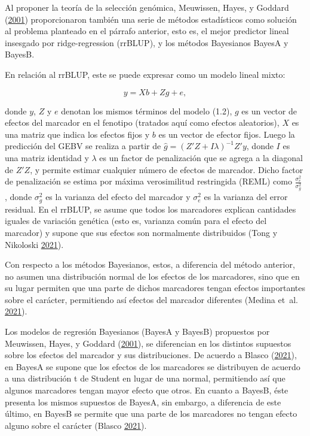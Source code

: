 \documentclass[11pt,spanish,a4paper,oneside,]{book} %
\begin{document}
Al proponer la teoría de la selección genómica, Meuwissen, Hayes, y Goddard (\protect\hyperlink{ref-cite:8}{2001}) proporcionaron también una serie de métodos estadísticos como solución al problema planteado en el párrafo anterior, esto es, el mejor predictor lineal insesgado por ridge-regression (rrBLUP), y los métodos Bayesianos BayesA y BayesB.

En relación al rrBLUP, este se puede expresar como un modelo lineal mixto:

\begin{equation}
y = Xb + Zg + e,
\end{equation}

donde \(y\), \(Z\) y \(e\) denotan los mismos términos del modelo (1.2), \(g\) es un vector de efectos del marcador en el fenotipo (tratados aquí como efectos aleatorios), \(X\) es una matriz que indica los efectos fijos y \(b\) es un vector de efector fijos. Luego la predicción del GEBV se realiza a partir de \(\hat{g} = (Z'Z + I \lambda)^{- 1} Z'y\), donde \(I\) es una matriz identidad y \(\lambda\) es un factor de penalización que se agrega a la diagonal de \(Z'Z\), y permite estimar cualquier número de efectos de marcador. Dicho factor de penalización se estima por máxima verosimilitud restringida (REML) como \(\frac{\sigma^{2}_{e}} {\sigma^{2}_{g}}\) , donde \(\sigma^{2}_{g}\) es la varianza del efecto del marcador y \(\sigma^{2}_{e}\) es la varianza del error residual. En el rrBLUP, se asume que todos los marcadores explican cantidades iguales de variación genética (esto es, varianza común para el efecto del marcador) y supone que sus efectos son normalmente distribuidos (Tong y Nikoloski \protect\hyperlink{ref-cite:7}{2021}).

Con respecto a los métodos Bayesianos, estos, a diferencia del método anterior, no asumen una distribución normal de los efectos de los marcadores, sino que en su lugar permiten que una parte de dichos marcadores tengan efectos importantes sobre el carácter, permitiendo así efectos del marcador diferentes (Medina et~al. \protect\hyperlink{ref-cite:38}{2021}).

Los modelos de regresión Bayesianos (BayesA y BayesB) propuestos por Meuwissen, Hayes, y Goddard (\protect\hyperlink{ref-cite:8}{2001}), se diferencian en los distintos supuestos sobre los efectos del marcador y sus distribuciones. De acuerdo a Blasco (\protect\hyperlink{ref-cite:21}{2021}), en BayesA se supone que los efectos de los marcadores se distribuyen de acuerdo a una distribución t de Student en lugar de una normal, permitiendo así que algunos marcadores tengan mayor efecto que otros. En cuanto a BayesB, éste presenta los mismos supuestos de BayesA, sin embargo, a diferencia de este último, en BayesB se permite que una parte de los marcadores no tengan efecto alguno sobre el carácter (Blasco \protect\hyperlink{ref-cite:21}{2021}).
\end{document}
